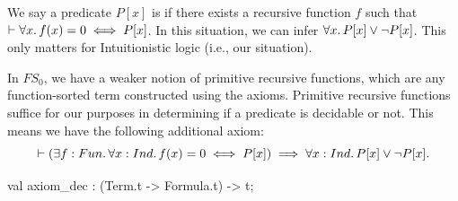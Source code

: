 \begin{node}
We say a predicate $P[x]$ is  if there exists a
recursive function $f$ such that $\vdash\forall x\ldotp f(x)=0\iff P[x]$.
In this situation, we can infer $\forall x\ldotp P[x]\lor\neg P[x]$.
This only matters for Intuitionistic logic (i.e., our situation).

In $FS_{0}$, we have a weaker notion of primitive recursive functions,
which are any function-sorted term constructed using the
axioms. Primitive recursive functions suffice for our purposes in
determining if a predicate is decidable or not.
This means we have the following additional axiom:
\begin{equation}
\vdash(\exists f:Fun\ldotp\forall x:Ind\ldotp f(x)=0\iff P[x])\implies\forall x:Ind\ldotp P[x]\lor\neg P[x].
\end{equation}
\end{node}

\nwenddocs{}\plusendmoddef\nwstartdeflinemarkup{}\nwenddeflinemarkup
val axiom_dec : (Term.t -> Formula.t) -> t;
\nwendcode{}\nwdocspar

